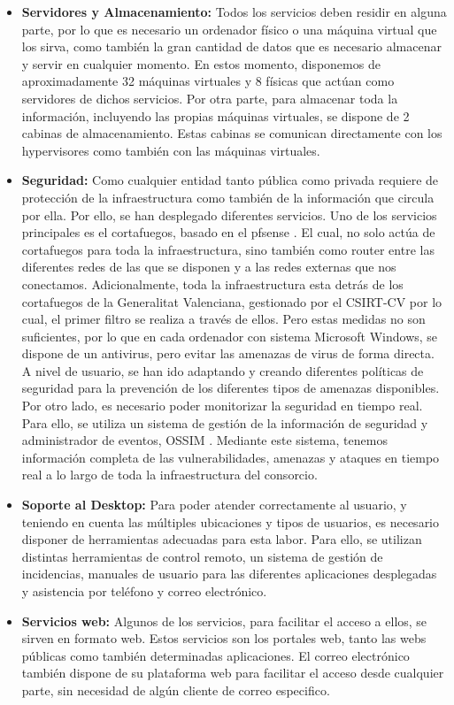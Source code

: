 \documentclass[12pt,a4paper,titlepage,twoside]{report}
\begin{document}
\begin{itemize}
\item \textbf{Servidores y Almacenamiento:} Todos los servicios deben residir en alguna parte, por lo que es necesario un ordenador físico o una máquina virtual que los sirva, como también la gran cantidad de datos que es necesario almacenar y servir en cualquier momento. En estos momento, disponemos de aproximadamente 32 máquinas virtuales y 8 físicas que actúan como servidores de dichos servicios. Por otra parte, para almacenar toda la información, incluyendo las propias máquinas virtuales, se dispone de 2 cabinas de almacenamiento. Estas cabinas se comunican directamente con los hypervisores como también con las máquinas virtuales. 
\item \textbf{Seguridad:} Como cualquier entidad tanto pública como privada requiere de protección de la infraestructura como también de la información que circula por ella. Por ello, se han desplegado diferentes servicios. Uno de los servicios principales es el cortafuegos, basado en el pfsense \cite{pfsense}. El cual, no solo actúa de cortafuegos para toda la infraestructura, sino también como router entre las diferentes redes de las que se disponen y a las redes externas que nos conectamos. Adicionalmente, toda la infraestructura esta detrás de los cortafuegos de la Generalitat Valenciana, gestionado por el CSIRT-CV \cite{csirtcv} por lo cual, el primer filtro se realiza a través de ellos. Pero estas medidas no son suficientes, por lo que en cada ordenador con sistema Microsoft Windows, se dispone de un antivirus, pero evitar las amenazas de virus de forma directa. A nivel de usuario, se han ido adaptando y creando diferentes políticas de seguridad para la prevención de los diferentes tipos de amenazas disponibles. Por otro lado, es necesario poder monitorizar la seguridad en tiempo real. Para ello, se utiliza un sistema de gestión de la información de seguridad y administrador de eventos, OSSIM \cite{ossim}. Mediante este sistema, tenemos información completa de las vulnerabilidades, amenazas y ataques en tiempo real a lo largo de toda la infraestructura del consorcio.
\item \textbf{Soporte al Desktop:} Para poder atender correctamente al usuario, y teniendo en cuenta las múltiples ubicaciones y tipos de usuarios, es necesario disponer de herramientas adecuadas para esta labor. Para ello, se utilizan distintas herramientas de control remoto, un sistema de gestión de incidencias, manuales de usuario para las diferentes aplicaciones desplegadas y asistencia por teléfono y correo electrónico.
\item \textbf{Servicios web:} Algunos de los servicios, para facilitar el acceso a ellos, se sirven en formato web. Estos servicios son los portales web, tanto las webs públicas como también determinadas aplicaciones. El correo electrónico también dispone de su plataforma web para facilitar el acceso desde cualquier parte, sin necesidad de algún cliente de correo especifico. 

\end{itemize}
\end{document}
